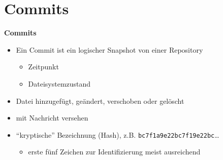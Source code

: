 \section{Commits}\label{sec:commits}

\begin{frame}[b]
    \begin{center}
    \end{center}
    \vfill
    \begin{flushleft}
        \Huge
        \textbf{Commits}
    \end{flushleft}
\end{frame}

\begin{frame}
    \slidehead
    \begin{itemize}
        \item Ein Commit ist ein logischer Snapshot von einer Repository
            \begin{itemize}
                \item Zeitpunkt
                \item Dateisystemzustand
            \end{itemize}
        \item Datei hinzugefügt, geändert, verschoben oder gelöscht
        \item mit Nachricht versehen
        \item \enquote{kryptische} Bezeichnung (Hash), z.B. \texttt{bc7f1a9e22bc7f19e22bc}\dots
            \begin{itemize}
                \item erste fünf Zeichen zur Identifizierung meist ausreichend
            \end{itemize}
    \end{itemize}
\end{frame}

